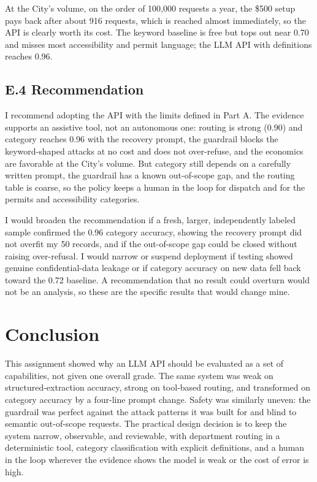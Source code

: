\documentclass[11pt]{article}
\begin{document}
At the City's volume, on the order of 100,000 requests a year, the \$500 setup pays back after about 916 requests, which is reached almost immediately, so the API is clearly worth its cost. The keyword baseline is free but tops out near 0.70 and misses most accessibility and permit language; the LLM API with definitions reaches 0.96.

\subsection*{E.4 Recommendation}
I recommend adopting the API with the limits defined in Part A. The evidence supports an assistive tool, not an autonomous one: routing is strong (0.90) and category reaches 0.96 with the recovery prompt, the guardrail blocks the keyword-shaped attacks at no cost and does not over-refuse, and the economics are favorable at the City's volume. But category still depends on a carefully written prompt, the guardrail has a known out-of-scope gap, and the routing table is coarse, so the policy keeps a human in the loop for dispatch and for the permits and accessibility categories.

I would broaden the recommendation if a fresh, larger, independently labeled sample confirmed the 0.96 category accuracy, showing the recovery prompt did not overfit my 50 records, and if the out-of-scope gap could be closed without raising over-refusal. I would narrow or suspend deployment if testing showed genuine confidential-data leakage or if category accuracy on new data fell back toward the 0.72 baseline. A recommendation that no result could overturn would not be an analysis, so these are the specific results that would change mine.

\section*{Conclusion}
This assignment showed why an LLM API should be evaluated as a set of capabilities, not given one overall grade. The same system was weak on structured-extraction accuracy, strong on tool-based routing, and transformed on category accuracy by a four-line prompt change. Safety was similarly uneven: the guardrail was perfect against the attack patterns it was built for and blind to semantic out-of-scope requests. The practical design decision is to keep the system narrow, observable, and reviewable, with department routing in a deterministic tool, category classification with explicit definitions, and a human in the loop wherever the evidence shows the model is weak or the cost of error is high.
\end{document}
